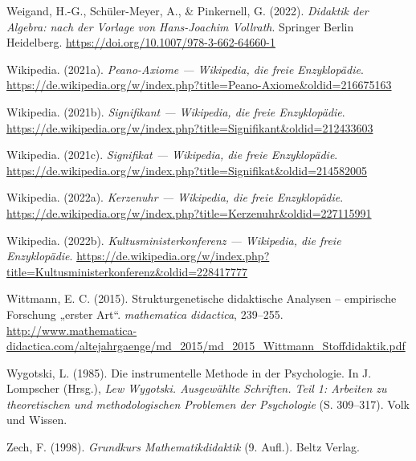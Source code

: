 \documentclass[
]{scrbook}
\newlength{\cslhangindent}
\newenvironment{CSLReferences}[2] %
 {\begin{list}{}{%
  \setlength{\itemindent}{0pt}
  \setlength{\leftmargin}{0pt}
  \setlength{\parsep}{0pt}
  \ifodd #1
   \setlength{\leftmargin}{\cslhangindent}
   \setlength{\itemindent}{-1\cslhangindent}
  \fi
  \setlength{\itemsep}{#2\baselineskip}}}
 {\end{list}}
\theoremstyle{definition}
\theoremstyle{definition}
\theoremstyle{definition}
\theoremstyle{definition}
\theoremstyle{remark}
\begin{document}
\begin{CSLReferences}{1}{0}
Weigand, H.-G., Schüler-Meyer, A., \& Pinkernell, G. (2022). \emph{Didaktik der {Algebra}: nach der {Vorlage} von {Hans}-{Joachim} {Vollrath}}. Springer Berlin Heidelberg. \url{https://doi.org/10.1007/978-3-662-64660-1}

Wikipedia. (2021a). \emph{Peano-Axiome --- Wikipedia{,} die freie Enzyklopädie}. \url{https://de.wikipedia.org/w/index.php?title=Peano-Axiome&oldid=216675163}

Wikipedia. (2021b). \emph{Signifikant --- Wikipedia{,} die freie Enzyklopädie}. \url{https://de.wikipedia.org/w/index.php?title=Signifikant&oldid=212433603}

Wikipedia. (2021c). \emph{Signifikat --- Wikipedia{,} die freie Enzyklopädie}. \url{https://de.wikipedia.org/w/index.php?title=Signifikat&oldid=214582005}

Wikipedia. (2022a). \emph{Kerzenuhr --- Wikipedia{,} die freie Enzyklopädie}. \url{https://de.wikipedia.org/w/index.php?title=Kerzenuhr&oldid=227115991}

Wikipedia. (2022b). \emph{Kultusministerkonferenz --- Wikipedia{,} die freie Enzyklopädie}. \url{https://de.wikipedia.org/w/index.php?title=Kultusministerkonferenz&oldid=228417777}

Wittmann, E. C. (2015). Strukturgenetische didaktische {Analysen} -- empirische {Forschung} „erster {Art}``. \emph{mathematica didactica}, 239--255. \url{http://www.mathematica-didactica.com/altejahrgaenge/md_2015/md_2015_Wittmann_Stoffdidaktik.pdf}

Wygotski, L. (1985). Die instrumentelle {Methode} in der {Psychologie}. In J. Lompscher (Hrsg.), \emph{Lew {Wygotski}. {Ausgewählte} {Schriften}. {Teil} 1: {Arbeiten} zu theoretischen und methodologischen {Problemen} der {Psychologie}} (S. 309--317). Volk und Wissen.

Zech, F. (1998). \emph{Grundkurs {Mathematikdidaktik}} (9. Aufl.). Beltz Verlag.

\end{CSLReferences}

\end{document}
